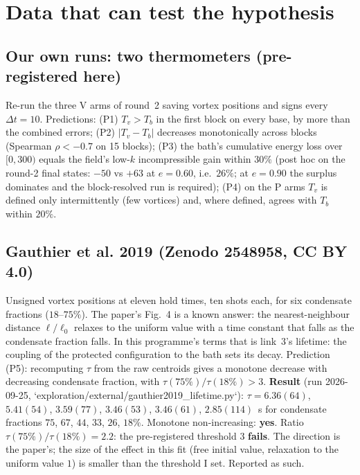 \documentclass[11pt,a4paper]{article}
\begin{document}
\section{Data that can test the hypothesis}\label{sec:data}

\subsection{Our own runs: two thermometers (pre-registered here)}
Re-run the three V arms of round~2 saving vortex positions and signs every $\Delta t=10$. Predictions:
(P1) $T_v>T_b$ in the first block on every base, by more than the combined errors; (P2) $|T_v-T_b|$
decreases monotonically across blocks (Spearman $\rho<-0.7$ on 15 blocks); (P3) the bath's cumulative
energy loss over $[0,300)$ equals the field's low-$k$ incompressible gain within $30\%$ (post hoc on the round-2
final states: $-50$ vs $+63$ at $e=0.60$, i.e.\ $26\%$; at $e=0.90$ the surplus dominates and the block-resolved
run is required); (P4) on the P arms $T_v$ is
defined only intermittently (few vortices) and, where defined, agrees with $T_b$ within $20\%$.

\subsection{Gauthier et al. 2019 (Zenodo 2548958, CC BY 4.0)}
Unsigned vortex positions at eleven hold times, ten shots each, for six condensate fractions ($18$--$75\%$).
The paper's Fig.~4 is a known answer: the nearest-neighbour distance $\ell/\ell_0$ relaxes to the uniform
value with a time constant that falls as the condensate fraction falls. In this programme's terms that is
link~3's lifetime: the coupling of the protected configuration to the bath sets its decay. Prediction (P5):
recomputing $\tau$ from the raw centroids gives a monotone decrease with decreasing condensate fraction,
with $\tau(75\%)/\tau(18\%)>3$. \textbf{Result} (run 2026-09-25, `exploration/external/gauthier2019\_lifetime.py`):
$\tau=6.36(64)$, $5.41(54)$, $3.59(77)$, $3.46(53)$, $3.46(61)$, $2.85(114)$~s for condensate fractions $75$, $67$, $44$,
$33$, $26$, $18\%$. Monotone non-increasing: \textbf{yes}. Ratio $\tau(75\%)/\tau(18\%)=2.2$: the pre-registered
threshold $3$ \textbf{fails}. The direction is the paper's; the size of the effect in this fit (free initial
value, relaxation to the uniform value $1$) is smaller than the threshold I set. Reported as such.
\end{document}
